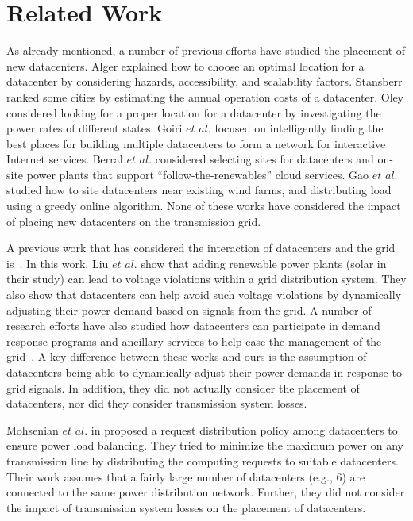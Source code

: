 \section{Related Work}
\label{sec:related}

As already mentioned, a number of previous efforts have studied the
placement of new datacenters.  Alger \cite{Dalger05} explained how to
choose an optimal location for a datacenter by considering hazards,
accessibility, and scalability factors.  Stansberr \cite{Stansberr06}
ranked some cities by estimating the annual operation costs of a
datacenter.  Oley \cite{Boley09} considered looking for a proper
location for a datacenter by investigating the
power rates of different states.  Goiri $\textit{et al.}$
\cite{Goiri11place} focused on intelligently finding the best places
for building multiple datacenters to form a network for interactive
Internet services.  Berral $\textit{et al.}$ \cite{berral2014building}
considered selecting sites for datacenters and on-site power plants
that support ``follow-the-renewables'' cloud services.  Gao $\textit{et al.}$
\cite{gao2013answer} studied how to site datacenters near existing
wind farms, and distributing load using a greedy online algorithm.
None of these works have considered the impact of placing new
datacenters on the transmission grid. 

A previous work that has considered the interaction of datacenters and
the grid is~\cite{liu2014pricing}.  In this work, Liu $\textit{et
  al.}$ show that adding renewable power plants (solar in their study)
can lead to voltage violations within a grid distribution system.
They also show that datacenters can help avoid such voltage
violations by dynamically adjusting their power demand based on
signals from the grid.  A number of research efforts have also studied
how datacenters can participate in demand response programs and
ancillary services to help ease the management of the
grid~\cite{Aikema12,AdamWierman2014}.  A key difference between these
works and ours is the assumption of datacenters being able to
dynamically adjust their power demands in response to grid signals.
In addition, they did not actually consider the placement of
datacenters, nor did they consider transmission system losses.

Mohsenian $\textit{et al.}$ in \cite{Mohsenian-Rad10grid} proposed a
request distribution policy among datacenters to ensure power load
balancing. They tried to minimize the maximum power on any
transmission line by distributing the computing requests to suitable
datacenters. Their work assumes that a fairly large number of
datacenters (e.g., 6) are connected to the same power distribution
network.  Further, they did not consider the impact of transmission system losses on the placement of datacenters.

